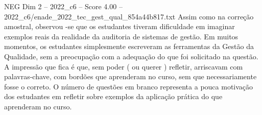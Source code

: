 \begin{textsample}{NEG Dim 2 – 2022\_c6 – Score 4.00 – 2022\_c6/enade\_2022\_tec\_gest\_qual\_854a44b817.txt}
Assim como na correção amostral, observou -se que os estudantes tiveram dificuldade em imaginar exemplos reais da realidade da auditoria de sistemas de gestão.
Em muitos momentos, os estudantes simplesmente escreveram as ferramentas da Gestão da Qualidade, sem a preocupação com a adequação do que foi solicitado na questão.
A impressão que fica é que, sem poder ( ou querer ) refletir, arriscavam com palavras-chave, com bordões que aprenderam no curso, sem que necessariamente fosse o correto.
O número de questões em branco representa a pouca motivação dos estudantes em refletir sobre exemplos da aplicação prática do que aprenderam no curso.

\end{textsample}
